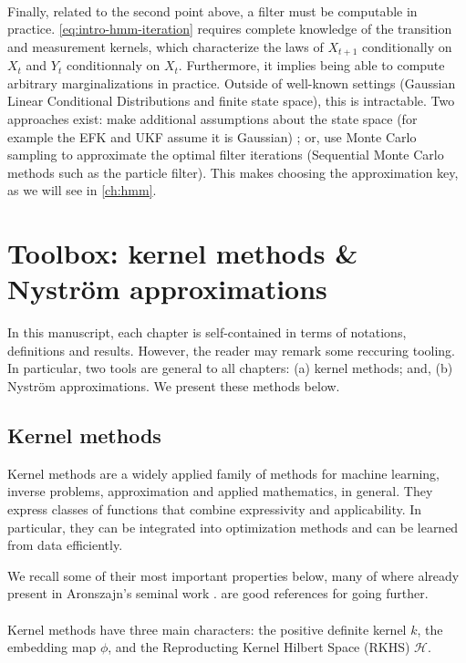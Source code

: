 \paragraph{} Finally, related to the second point above, a filter must be computable in practice. \cref{eq:intro-hmm-iteration} requires complete knowledge of the transition and measurement kernels, which characterize the laws of $X_{t+1}$ conditionally on $X_t$ and $Y_t$ conditionnaly on $X_t$. Furthermore, it implies being able to compute arbitrary marginalizations in practice. Outside of well-known settings (Gaussian Linear Conditional Distributions and finite state space), this is intractable. Two approaches exist: make additional assumptions about the state space (for example the EFK and UKF assume it is Gaussian) ; or, use Monte Carlo sampling to approximate the optimal filter iterations (Sequential Monte Carlo methods such as the particle filter). This makes choosing the approximation key, as we will see in \cref{ch:hmm}.



\section{Toolbox: kernel methods \& Nyström approximations}\label{sec:tools}
In this manuscript, each chapter is self-contained in terms of notations, definitions and results. However, the reader may remark some reccuring tooling. In particular, two tools are general to all chapters: (a) kernel methods; and, (b) Nyström approximations. We present these methods below.

\subsection{Kernel methods}
Kernel methods are a widely applied family of methods for machine learning, inverse problems, approximation and applied mathematics, in general. They express classes of functions that combine expressivity and applicability. In particular, they can be integrated into optimization methods and can be learned from data efficiently.

We recall some of their most important properties below, many of where already present in Aronszajn's seminal work \citep{aronszajn1950theory}. \cite{shawe-taylor2004,scholkopf-kernels} are good references for going further.

\paragraph{}
Kernel methods have three main characters: the positive definite kernel $k$, the embedding map $\phi$, and the Reproducting Kernel Hilbert Space (RKHS) $\mathcal H$.


